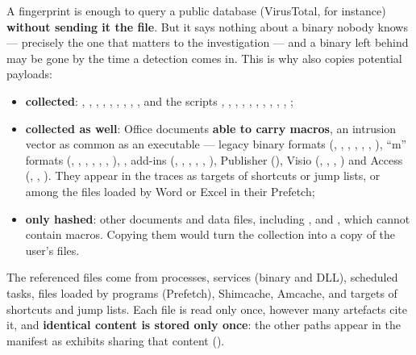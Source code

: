 \documentclass[11pt,a4paper,oneside]{report}
\begin{document}
A fingerprint is enough to query a public database (VirusTotal, for instance)
\textbf{without sending it the file}. But it says nothing about a binary nobody
knows — precisely the one that matters to the investigation — and a binary left
behind may be gone by the time a detection comes in. This is why 
also copies potential payloads:

\begin{itemize}
  \item \textbf{collected}: , , ,
        , , , ,
        , ,  and the scripts
        , , , ,
        , , , ,
        , , ;
  \item \textbf{collected as well}: Office documents \textbf{able to carry
        macros}, an intrusion vector as common as an executable — legacy binary
        formats (, , , ,
        , , ), ``m'' formats
        (, , , ,
        , , ), , add-ins
        (, , , ,
        , ), Publisher (), Visio
        (, , , ) and
        Access (, , ). They appear in
        the traces as targets of shortcuts or jump lists, or among the files
        loaded by Word or Excel in their Prefetch;
  \item \textbf{only hashed}: other documents and data files, including
        ,  and , which cannot contain
        macros. Copying them would turn the collection into a copy of the
        user's files.
\end{itemize}

The referenced files come from processes, services (binary and DLL), scheduled
tasks, files loaded by programs (Prefetch), Shimcache, Amcache, and targets of
shortcuts and jump lists. Each file is read only once, however many artefacts
cite it, and \textbf{identical content is stored only once}: the other paths
appear in the manifest as exhibits sharing that content
().
\end{document}
